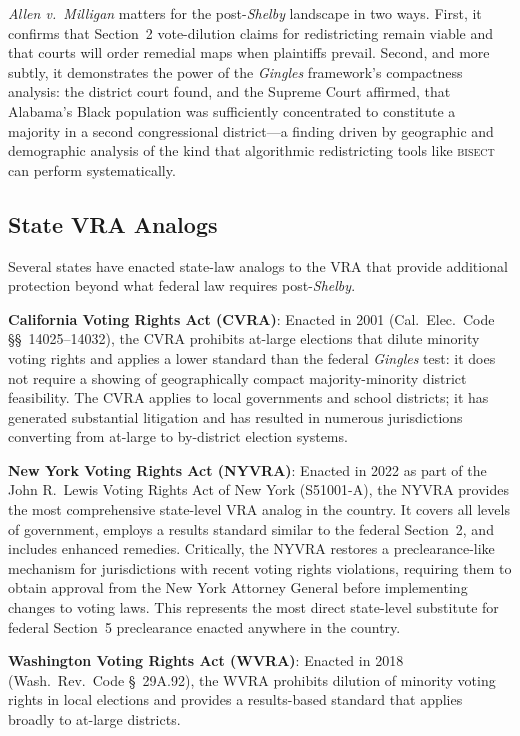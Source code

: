 \textit{Allen v.\ Milligan} matters for the post-\textit{Shelby} landscape
in two ways. First, it confirms that Section~2 vote-dilution claims for
redistricting remain viable and that courts will order remedial maps
when plaintiffs prevail. Second, and more subtly, it demonstrates the
power of the \textit{Gingles} framework's compactness analysis: the
district court found, and the Supreme Court affirmed, that Alabama's
Black population was sufficiently concentrated to constitute a majority
in a second congressional district---a finding driven by geographic and
demographic analysis of the kind that algorithmic redistricting tools
like \textsc{bisect} can perform systematically.

\subsection{State VRA Analogs}

Several states have enacted state-law analogs to the VRA that provide
additional protection beyond what federal law requires post-\textit{Shelby}.

\textbf{California Voting Rights Act (CVRA)}: Enacted in 2001 (Cal.\ Elec.\
Code \S\S\ 14025--14032), the CVRA prohibits at-large elections that dilute
minority voting rights and applies a lower standard than the federal
\textit{Gingles} test: it does not require a showing of geographically
compact majority-minority district feasibility. The CVRA applies to local
governments and school districts; it has generated substantial litigation
and has resulted in numerous jurisdictions converting from at-large to
by-district election systems.

\textbf{New York Voting Rights Act (NYVRA)}: Enacted in 2022 as part of
the John R.\ Lewis Voting Rights Act of New York (S51001-A), the NYVRA
provides the most comprehensive state-level VRA analog in the country.
It covers all levels of government, employs a results standard similar
to the federal Section~2, and includes enhanced remedies. Critically,
the NYVRA restores a preclearance-like mechanism for jurisdictions with
recent voting rights violations, requiring them to obtain approval from
the New York Attorney General before implementing changes to voting laws.
This represents the most direct state-level substitute for federal Section~5
preclearance enacted anywhere in the country.

\textbf{Washington Voting Rights Act (WVRA)}: Enacted in 2018 (Wash.\ Rev.\
Code \S\ 29A.92), the WVRA prohibits dilution of minority voting rights in
local elections and provides a results-based standard that applies broadly
to at-large districts.

